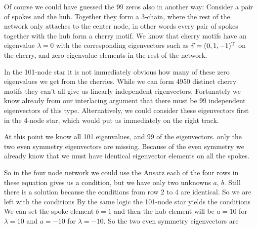 Of course we could have guessed the 99 zeros also in another way: Consider a pair of spokes and the hub. Together they form a 3-chain, where the rest of the network only attaches to the center node, in other words every pair of spokes together with the hub form a cherry motif. We know that cherry motifs have an eigenvalue $\lambda=0$ with the corresponding eigenvectors such as $\vec{v}=(0,1,-1)^{\rm T}$ on the cherry, and zero eigenvalue elements in the rest of the network.

In the 101-node star it is not immediately obvious how many of these zero eigenvalues we get from the cherries. While we can form 4950 distinct cherry motifs they can't all give us linearly independent eigenvectors. Fortunately we know already from our interlacing argument that there must be 99 independent eigenvectors of this type. Alternatively, we could consider these eigenvectors first in the 4-node star, which would put us immediately on the right track. 

At this point we know all 101 eigenvalues, and 99 of the eigenvectors. only the two even symmetry eigenvectors are missing. Because of the even symmetry we already know that we must have identical eigenvector elements on all the spokes.

So in the four node network we could use the Ansatz 
each of the four rows in these equation gives us a condition, but we have only two unknowns $a$, $b$. Still there is a solution because the conditions from row 2 to 4 are identical. So we are left with the conditions 
By the same logic the 101-node star yields the conditions 
We can set the spoke element $b=1$ and then the hub element will be $a=10$ for $\lambda=10$ and $a=-10$ for $\lambda=-10$. So the two even symmetry eigenvectors are

